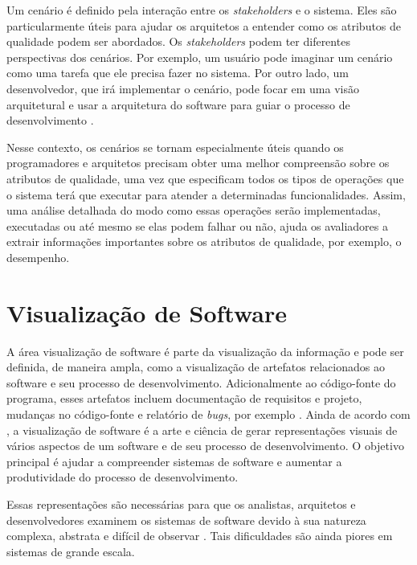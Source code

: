 Um cenário é definido pela interação entre os \textit{stakeholders} e o sistema. Eles são particularmente úteis para ajudar os arquitetos a entender como os atributos de qualidade podem ser abordados. Os \textit{stakeholders} podem ter diferentes perspectivas dos cenários. Por exemplo, um usuário pode imaginar um cenário como uma tarefa que ele precisa fazer no sistema. Por outro lado, um desenvolvedor, que irá implementar o cenário, pode focar em uma visão arquitetural e usar a arquitetura do software para guiar o processo de desenvolvimento \cite{Pinto2015}.

Nesse contexto, os cenários se tornam especialmente úteis quando os programadores e arquitetos precisam obter uma melhor compreensão sobre os atributos de qualidade, uma vez que especificam todos os tipos de operações que o sistema terá que executar para atender a determinadas funcionalidades. Assim, uma análise detalhada do modo como essas operações serão implementadas, executadas ou até mesmo se elas podem falhar ou não, ajuda os avaliadores a extrair informações importantes sobre os atributos de qualidade, por exemplo, o desempenho.

\section{Visualização de Software} \label{sec:visualizacao-software}

A área visualização de software é parte da visualização da informação e pode ser definida, de maneira ampla, como a visualização de artefatos relacionados ao software e seu processo de desenvolvimento. Adicionalmente ao código-fonte do programa, esses artefatos incluem documentação de requisitos e projeto, mudanças no código-fonte e relatório de \textit{bugs}, por exemplo \cite{Diehl2007}. Ainda de acordo com \citeauthor{Diehl2007}, a visualização de software é a arte e ciência de gerar representações visuais de vários aspectos de um software e de seu processo de desenvolvimento. O objetivo principal é ajudar a compreender sistemas de software e aumentar a produtividade do processo de desenvolvimento.

Essas representações são necessárias para que os analistas, arquitetos e desenvolvedores examinem os sistemas de software devido à sua natureza complexa, abstrata e difícil de observar \cite{Petre2006}. Tais dificuldades são ainda piores em sistemas de grande escala.

